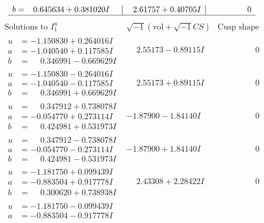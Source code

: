 \documentclass[1p]{elsarticle_modified}
\theoremstyle{definition}
\newcommand{\I}{\sqrt{-1}}
\begin{document}
$$\begin{array}{c|c|c}
\begin{aligned}
b &= \phantom{-}0.645634 + 0.381020 I\end{aligned}
 & \phantom{-}2.61757 + 0.40705 I & \phantom{-0.000000 } 0\\
 \hline 
 \end{array}$$\newpage$$\begin{array}{c|c|c}  
\text{Solutions to }I^u_{1}& \I (\text{vol} + \sqrt{-1}CS) & \text{Cusp shape}\\
 \hline 
\begin{aligned}
u &= -1.150830 + 0.264016 I \\
a &= -1.040540 + 0.117585 I \\
b &= \phantom{-}0.346991 - 0.669629 I\end{aligned}
 & \phantom{-}2.55173 - 0.89115 I & \phantom{-0.000000 } 0 \\ \hline\begin{aligned}
u &= -1.150830 - 0.264016 I \\
a &= -1.040540 - 0.117585 I \\
b &= \phantom{-}0.346991 + 0.669629 I\end{aligned}
 & \phantom{-}2.55173 + 0.89115 I & \phantom{-0.000000 } 0 \\ \hline\begin{aligned}
u &= \phantom{-}0.347912 + 0.738078 I \\
a &= -0.054770 + 0.273114 I \\
b &= \phantom{-}0.424981 + 0.531973 I\end{aligned}
 & -1.87900 - 1.84140 I & \phantom{-0.000000 } 0 \\ \hline\begin{aligned}
u &= \phantom{-}0.347912 - 0.738078 I \\
a &= -0.054770 - 0.273114 I \\
b &= \phantom{-}0.424981 - 0.531973 I\end{aligned}
 & -1.87900 + 1.84140 I & \phantom{-0.000000 } 0 \\ \hline\begin{aligned}
u &= -1.181750 + 0.099439 I \\
a &= -0.883504 + 0.917778 I \\
b &= \phantom{-}0.300620 + 0.738938 I\end{aligned}
 & \phantom{-}2.43308 + 2.28422 I & \phantom{-0.000000 } 0 \\ \hline\begin{aligned}
u &= -1.181750 - 0.099439 I \\
a &= -0.883504 - 0.917778 I \\

\end{aligned}
\end{array}$$
\end{document}

